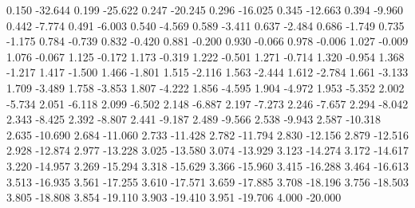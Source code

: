 0.150 -32.644
0.199 -25.622
0.247 -20.245
0.296 -16.025
0.345 -12.663
0.394 -9.960
0.442 -7.774
0.491 -6.003
0.540 -4.569
0.589 -3.411
0.637 -2.484
0.686 -1.749
0.735 -1.175
0.784 -0.739
0.832 -0.420
0.881 -0.200
0.930 -0.066
0.978 -0.006
1.027 -0.009
1.076 -0.067
1.125 -0.172
1.173 -0.319
1.222 -0.501
1.271 -0.714
1.320 -0.954
1.368 -1.217
1.417 -1.500
1.466 -1.801
1.515 -2.116
1.563 -2.444
1.612 -2.784
1.661 -3.133
1.709 -3.489
1.758 -3.853
1.807 -4.222
1.856 -4.595
1.904 -4.972
1.953 -5.352
2.002 -5.734
2.051 -6.118
2.099 -6.502
2.148 -6.887
2.197 -7.273
2.246 -7.657
2.294 -8.042
2.343 -8.425
2.392 -8.807
2.441 -9.187
2.489 -9.566
2.538 -9.943
2.587 -10.318
2.635 -10.690
2.684 -11.060
2.733 -11.428
2.782 -11.794
2.830 -12.156
2.879 -12.516
2.928 -12.874
2.977 -13.228
3.025 -13.580
3.074 -13.929
3.123 -14.274
3.172 -14.617
3.220 -14.957
3.269 -15.294
3.318 -15.629
3.366 -15.960
3.415 -16.288
3.464 -16.613
3.513 -16.935
3.561 -17.255
3.610 -17.571
3.659 -17.885
3.708 -18.196
3.756 -18.503
3.805 -18.808
3.854 -19.110
3.903 -19.410
3.951 -19.706
4.000 -20.000
